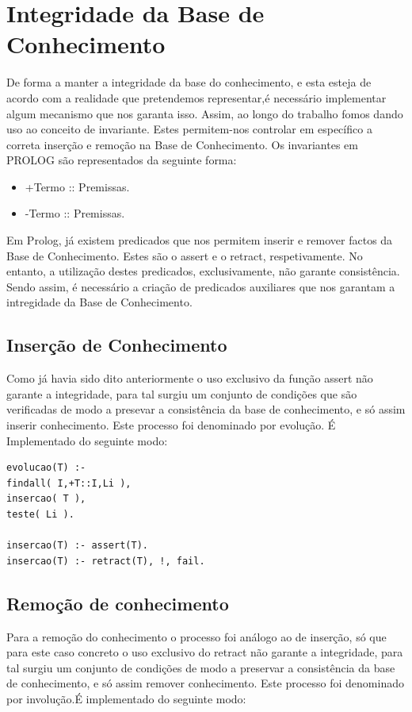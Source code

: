 \documentclass[25pt]{article}
\begin{document}
\newpage

\section{Integridade da Base de Conhecimento}
De forma a manter a integridade da base do conhecimento, e esta esteja de acordo com a realidade que pretendemos representar,é necessário implementar
algum mecanismo que nos garanta isso. Assim, ao longo do trabalho fomos dando uso ao conceito de invariante. Estes permitem-nos controlar em específico a
correta inserção e remoção na Base de Conhecimento. Os invariantes em PROLOG são representados da seguinte forma:
\begin{itemize}
\item +Termo :: Premissas.
\item -Termo :: Premissas.
\end{itemize}
Em Prolog, já existem predicados que nos permitem inserir e remover factos da Base de Conhecimento. Estes são o assert e o retract, respetivamente. No entanto, a utilização destes predicados, exclusivamente, não garante consistência. Sendo assim, é necessário a criação de predicados auxiliares que nos garantam a intregidade da Base de Conhecimento.

\subsection{Inserção de Conhecimento}
Como já havia sido dito anteriormente o uso exclusivo da função assert não garante a integridade, para tal surgiu um conjunto de condições que são
verificadas de modo a presevar a consistência da base de conhecimento, e só assim inserir conhecimento. Este processo foi denominado por evolução.
É Implementado do seguinte modo:
\begin{lstlisting}
evolucao(T) :-
findall( I,+T::I,Li ),
insercao( T ),
teste( Li ).

insercao(T) :- assert(T).
insercao(T) :- retract(T), !, fail.
\end{lstlisting}

\subsection{Remoção de conhecimento}

Para a remoção do conhecimento o processo foi análogo ao de inserção, só que para este caso concreto o uso exclusivo do retract não garante a integridade, para tal surgiu um conjunto de condições de modo a preservar a consistência da base de conhecimento, e só assim remover conhecimento.
Este processo foi denominado por involução.É implementado do seguinte modo:
\end{document}
